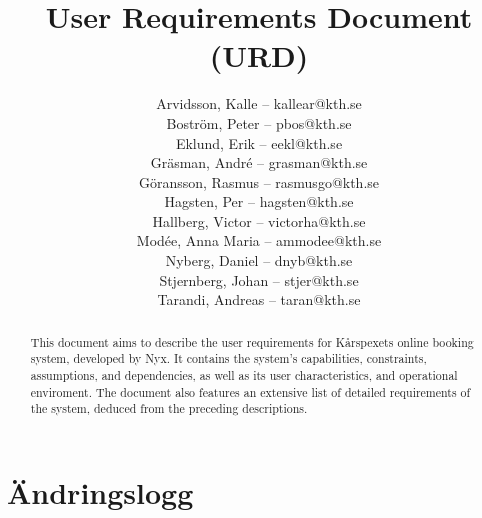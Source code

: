 \documentclass[a4paper, twoside, 11pt, titlepage]{article}
\author{
	\small
	Arvidsson, Kalle -- kallear@kth.se\\
	Boström, Peter -- pbos@kth.se\\
	Eklund, Erik -- eekl@kth.se\\
	Gräsman, André -- grasman@kth.se\\
	Göransson, Rasmus -- rasmusgo@kth.se\\
	Hagsten, Per -- hagsten@kth.se\\
	Hallberg, Victor -- victorha@kth.se\\
	Modée, Anna Maria -- ammodee@kth.se\\
	Nyberg, Daniel -- dnyb@kth.se\\
	Stjernberg, Johan -- stjer@kth.se\\
	Tarandi, Andreas -- taran@kth.se
	}
\title{User Requirements Document (URD)}
\begin{document}
\maketitle

\clearpage
\thispagestyle{empty}
\mbox{}
\newpage

\begin{abstract}
	This document aims to describe the user requirements for Kårspexets online booking system, developed by Nyx. It contains the system's capabilities, constraints, assumptions, and dependencies, as well as its user characteristics, and operational enviroment. The document also features an extensive list of detailed requirements of the system, deduced from the preceding descriptions.
\end{abstract}

\newpage

\setcounter{page}{1}

\startfooter

\clearpage
\section*{Ändringslogg}
\end{document}
